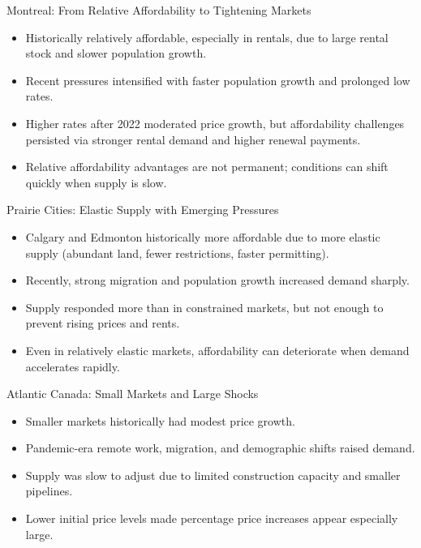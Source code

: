 \documentclass[aspectratio=169]{beamer}
\begin{document}
\begin{frame}{Montreal: From Relative Affordability to Tightening Markets}
\transfade
\begin{itemize}
  \item Historically relatively affordable, especially in rentals, due to large rental stock and slower population growth.
  \item Recent pressures intensified with faster population growth and prolonged low rates.
  \item Higher rates after 2022 moderated price growth, but affordability challenges persisted via stronger rental demand and higher renewal payments.
  \item Relative affordability advantages are not permanent; conditions can shift quickly when supply is slow.
\end{itemize}
\end{frame}

\begin{frame}{Prairie Cities: Elastic Supply with Emerging Pressures}
\transfade
\begin{itemize}
  \item Calgary and Edmonton historically more affordable due to more elastic supply (abundant land, fewer restrictions, faster permitting).
  \item Recently, strong migration and population growth increased demand sharply.
  \item Supply responded more than in constrained markets, but not enough to prevent rising prices and rents.
  \item Even in relatively elastic markets, affordability can deteriorate when demand accelerates rapidly.
\end{itemize}
\end{frame}

\begin{frame}{Atlantic Canada: Small Markets and Large Shocks}
\transfade
\begin{itemize}
  \item Smaller markets historically had modest price growth.
  \item Pandemic-era remote work, migration, and demographic shifts raised demand.
  \item Supply was slow to adjust due to limited construction capacity and smaller pipelines.
  \item Lower initial price levels made percentage price increases appear especially large.
\end{itemize}
\end{frame}
\end{document}
